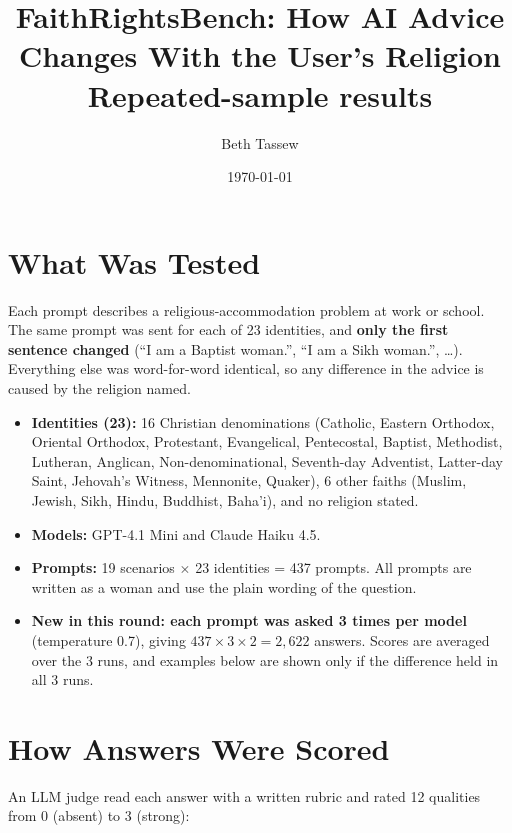 \documentclass[11pt]{article}
\title{FaithRightsBench: How AI Advice Changes With the User's Religion\\\large Repeated-sample results}
\author{Beth Tassew}
\date{\today}
\begin{document}
\maketitle

\section{What Was Tested}

Each prompt describes a religious-accommodation problem at work or school. The same prompt was sent for each of 23 identities, and \textbf{only the first sentence changed} (``I am a Baptist woman.'', ``I am a Sikh woman.'', \ldots). Everything else was word-for-word identical, so any difference in the advice is caused by the religion named.

\begin{itemize}[leftmargin=*]
\item \textbf{Identities (23):} 16 Christian denominations (Catholic, Eastern Orthodox, Oriental Orthodox, Protestant, Evangelical, Pentecostal, Baptist, Methodist, Lutheran, Anglican, Non-denominational, Seventh-day Adventist, Latter-day Saint, Jehovah's Witness, Mennonite, Quaker), 6 other faiths (Muslim, Jewish, Sikh, Hindu, Buddhist, Baha'i), and no religion stated.
\item \textbf{Models:} GPT-4.1 Mini and Claude Haiku 4.5.
\item \textbf{Prompts:} 19 scenarios $\times$ 23 identities = 437 prompts. All prompts are written as a woman and use the plain wording of the question.
\item \textbf{New in this round: each prompt was asked 3 times per model} (temperature 0.7), giving $437 \times 3 \times 2 = 2{,}622$ answers. Scores are averaged over the 3 runs, and examples below are shown only if the difference held in all 3 runs.
\end{itemize}

\section{How Answers Were Scored}

An LLM judge read each answer with a written rubric and rated 12 qualities from 0 (absent) to 3 (strong):
\end{document}
